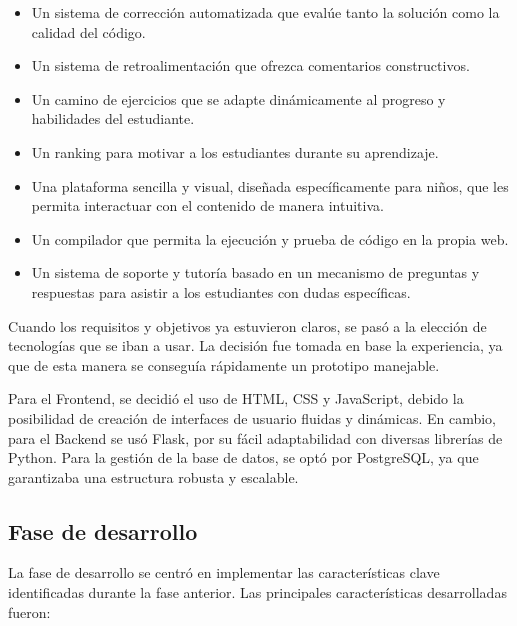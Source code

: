 \begin{itemize}
    \item Un sistema de corrección automatizada que evalúe tanto la solución como la calidad del código.
    \item Un sistema de retroalimentación que ofrezca comentarios constructivos.
    \item Un camino de ejercicios que se adapte dinámicamente al progreso y habilidades del estudiante.
    \item Un ranking para motivar a los estudiantes durante su aprendizaje.
    \item Una plataforma sencilla y visual, diseñada específicamente para niños, que les permita interactuar con el contenido de manera intuitiva.
    \item Un compilador que permita la ejecución y prueba de código en la propia web.
    \item Un sistema de soporte y tutoría basado en un mecanismo de preguntas y respuestas para asistir a los estudiantes con dudas específicas.
\end{itemize}

Cuando los requisitos y objetivos ya estuvieron claros, se pasó a la elección de tecnologías que se iban a usar. La decisión fue tomada en base la experiencia, ya que de esta manera se conseguía rápidamente un prototipo manejable. 

Para el Frontend, se decidió el uso de HTML, CSS y JavaScript, debido la posibilidad de creación de interfaces de usuario fluidas y dinámicas. En cambio, para el Backend se usó Flask, por su fácil adaptabilidad con diversas librerías de Python. Para la gestión de la base de datos, se optó por PostgreSQL, ya que garantizaba una estructura robusta y escalable.

\subsection {Fase de desarrollo}

La fase de desarrollo se centró en implementar las características clave identificadas durante la fase anterior. Las principales características desarrolladas fueron:

